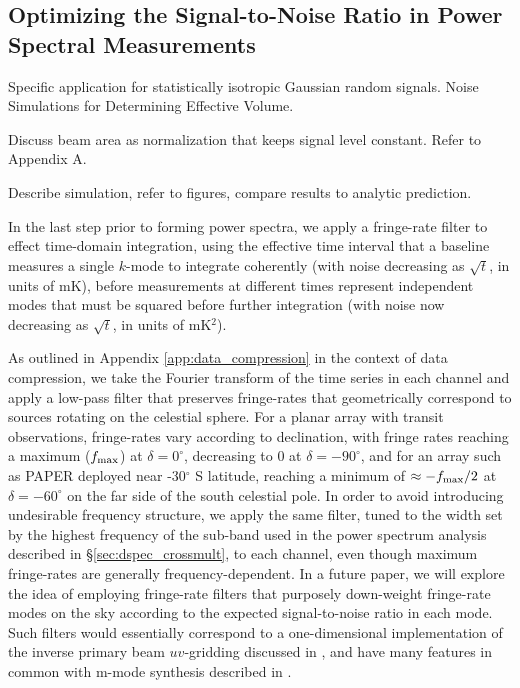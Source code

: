 \documentclass[twocolumn,apj,numberedappendix]{emulateapj}
\begin{document}
\subsection{Optimizing the Signal-to-Noise Ratio in Power Spectral Measurements}
\label{sec:sim_nos}

Specific application for statistically isotropic Gaussian random signals.
Noise Simulations for Determining Effective Volume.

Discuss beam area as normalization that keeps signal level constant.
Refer to \citet{parsons_et_al2014} Appendix A.

Describe simulation, refer to figures, compare results to analytic prediction.


In the last step prior to forming power spectra,
we apply a fringe-rate filter to effect time-domain integration,
using the effective time interval that a baseline measures a single $k$-mode to integrate coherently
(with noise decreasing
as $\sqrt{t}$, in units of mK), before measurements at different times represent independent modes
that must be squared before further integration (with noise now decreasing as $\sqrt{t}$, in units of mK$^2$).

As outlined in Appendix \ref{app:data_compression}
in the context of data compression, we
take the Fourier transform of the time series in each channel and apply a low-pass filter that preserves
fringe-rates that geometrically correspond to sources rotating on the celestial sphere.  
For a planar array with transit observations, fringe-rates vary according to declination, with fringe rates
reaching a maximum ($f_{\rm max}$) at 
$\delta=0^\circ$, decreasing to 0 at $\delta=-90^\circ$, and for an array such as PAPER deployed near
-30$^\circ$ S latitude, reaching a minimum of $\approx-f_{\rm max}/2$ at $\delta=-60^\circ$ on
the far side of the south celestial pole.
In order to
avoid introducing undesirable frequency structure, we apply the same filter, tuned to the width
set by the highest frequency of the sub-band used in the
power spectrum analysis described
in \S\ref{sec:dspec_crossmult}, to each channel,
even though maximum fringe-rates are generally frequency-dependent.
In a future paper, we will explore the idea
of employing fringe-rate filters that purposely down-weight fringe-rate modes on the sky according to
the expected signal-to-noise ratio in each mode.  Such filters would essentially correspond to a
one-dimensional implementation of the inverse primary beam $uv$-gridding discussed in \citet{morales_matejek2009},
and have many features in common with m-mode synthesis described in \citet{shaw_et_al2013}.
\end{document}
